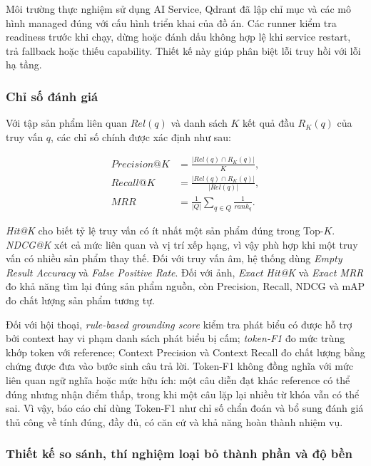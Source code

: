 Môi trường thực nghiệm sử dụng AI Service, Qdrant đã lập chỉ mục và các mô hình managed đúng với cấu hình triển khai của đồ án. Các runner kiểm tra readiness trước khi chạy, dừng hoặc đánh dấu không hợp lệ khi service restart, trả fallback hoặc thiếu capability. Thiết kế này giúp phân biệt lỗi truy hồi với lỗi hạ tầng.

\subsubsection{Chỉ số đánh giá}

Với tập sản phẩm liên quan $Rel(q)$ và danh sách $K$ kết quả đầu $R_K(q)$ của truy vấn $q$, các chỉ số chính được xác định như sau:

\begin{align}
    Precision@K &= \frac{|Rel(q) \cap R_K(q)|}{K}, \\
    Recall@K &= \frac{|Rel(q) \cap R_K(q)|}{|Rel(q)|}, \\
    MRR &= \frac{1}{|Q|}\sum_{q \in Q}\frac{1}{rank_q}.
\end{align}

\textit{Hit@K} cho biết tỷ lệ truy vấn có ít nhất một sản phẩm đúng trong Top-$K$. \textit{NDCG@K} xét cả mức liên quan và vị trí xếp hạng, vì vậy phù hợp khi một truy vấn có nhiều sản phẩm thay thế. Đối với truy vấn âm, hệ thống dùng \textit{Empty Result Accuracy} và \textit{False Positive Rate}. Đối với ảnh, \textit{Exact Hit@K} và \textit{Exact MRR} đo khả năng tìm lại đúng sản phẩm nguồn, còn Precision, Recall, NDCG và mAP đo chất lượng sản phẩm tương tự.

Đối với hội thoại, \textit{rule-based grounding score} kiểm tra phát biểu có được hỗ trợ bởi context hay vi phạm danh sách phát biểu bị cấm; \textit{token-F1} đo mức trùng khớp token với reference; Context Precision và Context Recall đo chất lượng bằng chứng được đưa vào bước sinh câu trả lời. Token-F1 không đồng nghĩa với mức liên quan ngữ nghĩa hoặc mức hữu ích: một câu diễn đạt khác reference có thể đúng nhưng nhận điểm thấp, trong khi một câu lặp lại nhiều từ khóa vẫn có thể sai. Vì vậy, báo cáo chỉ dùng Token-F1 như chỉ số chẩn đoán và bổ sung đánh giá thủ công về tính đúng, đầy đủ, có căn cứ và khả năng hoàn thành nhiệm vụ.

\subsubsection{Thiết kế so sánh, thí nghiệm loại bỏ thành phần và độ bền}

